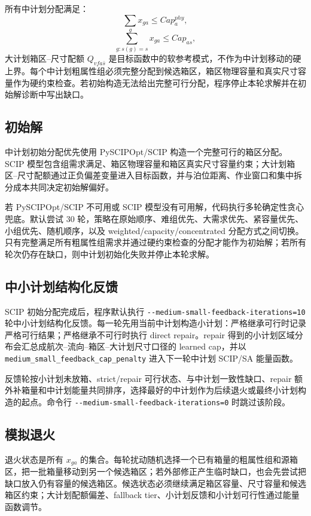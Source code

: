 \documentclass[UTF8,a4paper,11pt]{ctexart}
\newcommand{\code}[1]{\nolinkurl{#1}}
\begin{document}
所有中计划分配满足：
\[
\sum_g x_{ga}\le Cap_a^{phy},
\]
\[
\sum_{g:s(g)=s}x_{ga}\le Cap_{as},
\]
大计划箱区--尺寸配额 \(Q_{vfa\bar{s}}\) 是目标函数中的软参考模式，不作为中计划移动的硬上界。每个中计划粗属性组必须完整分配到候选箱区，箱区物理容量和真实尺寸容量作为硬约束检查。若初始构造无法给出完整可行分配，程序停止本轮求解并在初始解诊断中写出缺口。

\subsection{初始解}

中计划初始分配优先使用 PySCIPOpt/SCIP 构造一个完整可行的箱区分配。SCIP 模型包含组需求满足、箱区物理容量和箱区真实尺寸容量约束；大计划箱区--尺寸配额通过正负偏差变量进入目标函数，并与泊位距离、作业窗口和集中拆分成本共同决定初始解偏好。

若 PySCIPOpt/SCIP 不可用或 SCIP 模型没有可用解，代码执行多轮确定性贪心兜底。默认尝试 30 轮，策略在原始顺序、难组优先、大需求优先、紧容量优先、小组优先、随机顺序，以及 weighted/capacity/concentrated 分配方式之间切换。只有完整满足所有粗属性组需求并通过硬约束检查的分配才能作为初始解；若所有轮次仍存在缺口，则中计划初始化失败并停止本轮求解。

\subsection{中小计划结构化反馈}

SCIP 初始分配完成后，程序默认执行 \code{--medium-small-feedback-iterations=10} 轮中小计划结构化反馈。每一轮先用当前中计划构造小计划：严格继承可行时记录严格可行结果；严格继承不可行时执行 direct repair。repair 得到的小计划区域分布会汇总成航次--流向--箱区--大计划尺寸口径的 learned cap，并以 \code{medium_small_feedback_cap_penalty} 进入下一轮中计划 SCIP/SA 能量函数。

反馈轮按小计划未放箱、strict/repair 可行状态、与中计划一致性缺口、repair 额外补箱量和中计划能量共同排序，选择最好的中计划作为后续退火或最终小计划构造的起点。命令行 \code{--medium-small-feedback-iterations=0} 时跳过该阶段。

\subsection{模拟退火}

退火状态是所有 \(x_{ga}\) 的集合。每轮扰动随机选择一个已有箱量的粗属性组和源箱区，把一批箱量移动到另一个候选箱区；若外部修正产生临时缺口，也会先尝试把缺口放入仍有容量的候选箱区。候选状态必须继续满足箱区容量、尺寸容量和候选箱区约束；大计划配额偏差、fallback tier、小计划反馈和小计划可行性通过能量函数调节。
\end{document}
